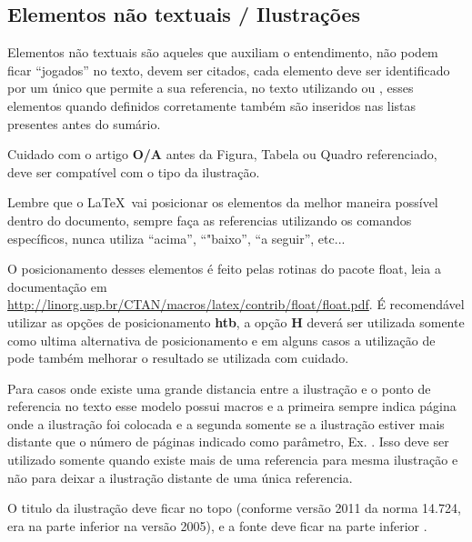 



\subsection{Elementos não textuais / Ilustrações}
\label{elementos-nao-textuais}

Elementos não textuais são aqueles que auxiliam o entendimento, não podem ficar \enquote{jogados} no texto, devem ser citados, cada elemento deve ser identificado por um  único que permite a sua referencia, no texto utilizando  ou , esses elementos quando definidos corretamente também são inseridos nas listas presentes antes do sumário.

Cuidado com o artigo \textbf{O/A} antes da Figura, Tabela ou Quadro referenciado, deve ser compatível com o tipo da ilustração.

Lembre que o \LaTeX \  vai posicionar os elementos  da melhor maneira possível dentro do documento, sempre faça as referencias utilizando os comandos específicos, nunca utiliza \enquote{acima}, \enquote{"baixo}, \enquote{a seguir}, etc... 

O posicionamento desses elementos é feito pelas rotinas do pacote float, leia a documentação em  \url{http://linorg.usp.br/CTAN/macros/latex/contrib/float/float.pdf}. É recomendável utilizar as opções de posicionamento \textbf{htb}, a opção \textbf{H} deverá ser utilizada somente como ultima alternativa de posicionamento e em alguns casos a utilização de  pode também melhorar o resultado se utilizada com cuidado.


Para casos onde existe uma grande distancia entre a ilustração e o ponto de referencia no texto esse modelo possui macros  e  a primeira sempre indica página onde a ilustração foi colocada e a segunda somente se a ilustração estiver mais distante que o número de páginas indicado como parâmetro, Ex. . Isso deve ser utilizado somente quando existe mais de uma referencia para mesma ilustração e não para deixar a ilustração distante de uma única referencia.

O titulo da ilustração deve ficar no topo (conforme versão 2011 da norma 14.724, era na parte inferior na versão 2005), e a fonte deve ficar na parte inferior \cite{NBR14724:2005} \cite{NBR14724:2011}.










